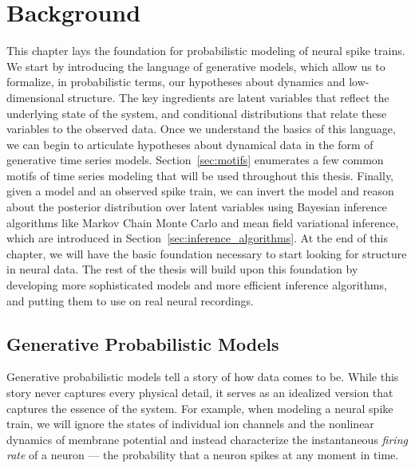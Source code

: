
\chapter{Background}
\label{chap:two}

This chapter lays the foundation for probabilistic modeling of neural
spike trains.  We start by introducing the language of generative
models, which allow us to formalize, in probabilistic terms, our
hypotheses about dynamics and low-dimensional structure.  The key
ingredients are latent variables that reflect the underlying state of
the system, and conditional distributions that relate these variables
to the observed data.  Once we understand the basics of this language,
we can begin to articulate hypotheses about dynamical data in the form
of generative time series models.  Section~\ref{sec:motifs} enumerates
a few common motifs of time series modeling that will be used
throughout this thesis.  Finally, given a model and an observed spike
train, we can invert the model and reason about the posterior
distribution over latent variables using Bayesian inference algorithms
like Markov Chain Monte Carlo and mean field variational inference,
which are introduced in Section~\ref{sec:inference_algorithms}.  At
the end of this chapter, we will have the basic foundation necessary
to start looking for structure in neural data. The rest of the thesis
will build upon this foundation by developing more sophisticated
models and more efficient inference algorithms, and putting them to
use on real neural recordings.

\section{Generative Probabilistic Models}
\label{sec:generative_models}
Generative probabilistic models tell a story of how data comes to be. 
While this story never captures every physical detail, it serves as an 
idealized version that captures the essence of the system. For example, when
modeling a neural spike train, we will ignore the states of individual ion 
channels and the nonlinear dynamics of membrane potential and instead 
characterize the instantaneous \emph{firing rate} of a neuron --- the 
probability that a neuron spikes at any moment in time. 

